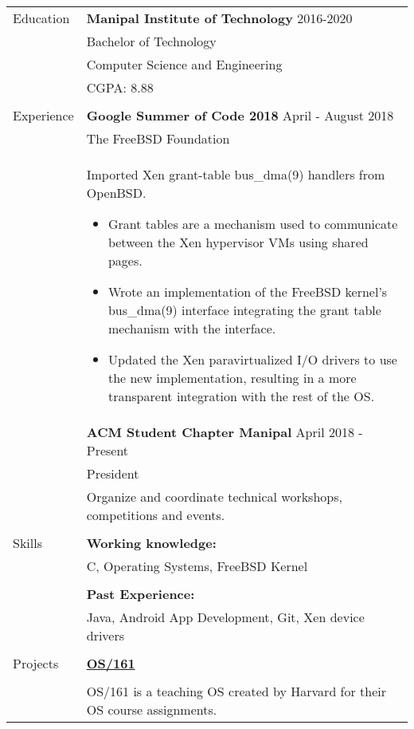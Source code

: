 \documentclass[letterpaper,11pt,oneside]{article}
\begin{document}
\noindent \begin{tabularx}{\textwidth}{l X}
 \Large{Education} & \textbf{Manipal Institute of Technology} \hfill 2016-2020  \\
     & Bachelor of Technology \\
     & Computer Science and Engineering \\
     &  CGPA: 8.88\\
     & \\
 \Large{Experience}    & \textbf{Google Summer of Code 2018} \hfill April - August 2018 \\
    & The FreeBSD Foundation \\
    & Imported Xen grant-table bus\_dma(9) handlers from OpenBSD. \vspace{-1ex}
    \begin{itemize}[label={--}]
    \setlength\itemsep{-0.25em}
        \item Grant tables are a mechanism used to communicate between the Xen hypervisor VMs using shared pages.
        \item Wrote an implementation of the FreeBSD kernel's bus\_dma(9) interface integrating the grant table mechanism with the interface.
        \item Updated the Xen paravirtualized I/O drivers to use the new implementation, resulting in a more transparent integration with the rest of the OS.
    \end{itemize} \\
    & \textbf{ACM Student Chapter Manipal} \hfill April 2018 -  Present \\
    & President \\
    & Organize and coordinate technical workshops, competitions and events. \\
    & \\
 \Large{Skills} & \textbf{Working knowledge:} \\
    & C, Operating Systems, FreeBSD Kernel \\
    & \\
    & \textbf{Past Experience:} \\
    & Java, Android App Development, Git, Xen device drivers \\
    & \\
 \Large{Projects} \vspace{-1.5ex} & \textbf{\href{https://github.com/prati0100/OS161}{OS/161}} \\
    \\
    & OS/161 is a teaching OS created by Harvard for their OS course assignments. \vspace{-0.75ex}

\end{tabularx}
\end{document}
